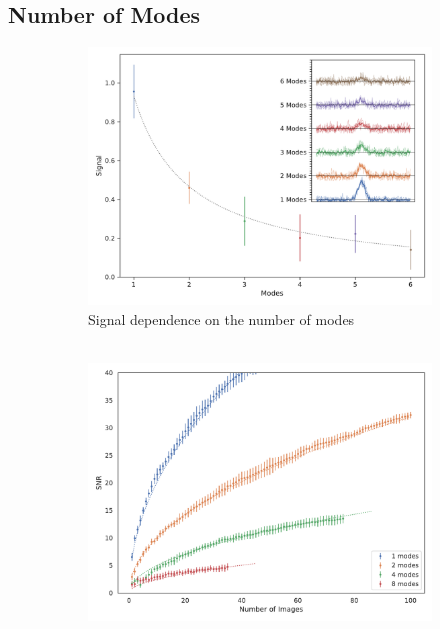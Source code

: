\subsection{Number of Modes}
\begin{figure}
	\centering
	\begin{subfigure}[b]{0.45\textwidth}
		\includegraphics[width=\linewidth]{images/modes_signal.pdf}
		\caption{Signal dependence on the number of modes\\ ${}$}
		\label{fig:modes}
	\end{subfigure}
	\hspace{0.02\textwidth}
	\begin{subfigure}[b]{0.45\textwidth}
	\includegraphics[width=\linewidth]{images/SNRNimagesgrating.pdf}

\end{subfigure}
\end{figure}
